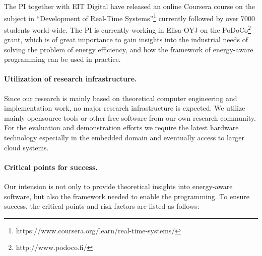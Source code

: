 \documentclass{article}
\begin{document}
The PI together with EIT Digital have released an online Coursera course on the subject in ``Development of Real-Time Systems''\footnote{https://www.coursera.org/learn/real-time-systems/} currently followed by over 7000 students world-wide.
The PI is currently working in Elisa OYJ on the PoDoCo\footnote{http://www.podoco.fi/} grant, which is of great importance to gain insights into the industrial needs of solving the problem of energy efficiency, 
and how the framework of energy-aware programming can be used in practice.

\paragraph{Utilization of research infrastructure. }
Since our research is mainly based on theoretical computer engineering and implementation work, no major research infrastructure is expected.
We utilize mainly opensource tools or other free software from our own research community.
For the evaluation and demonstration efforts we require the latest hardware technology especially in the embedded domain and eventually access to larger cloud systems.

\paragraph{Critical points for success. }
Our intension is not only to provide theoretical insights into energy-aware software, but also the framework needed to enable the programming.
To ensure success, the critical points and risk factors are listed as follows:\smallskip
\end{document}
